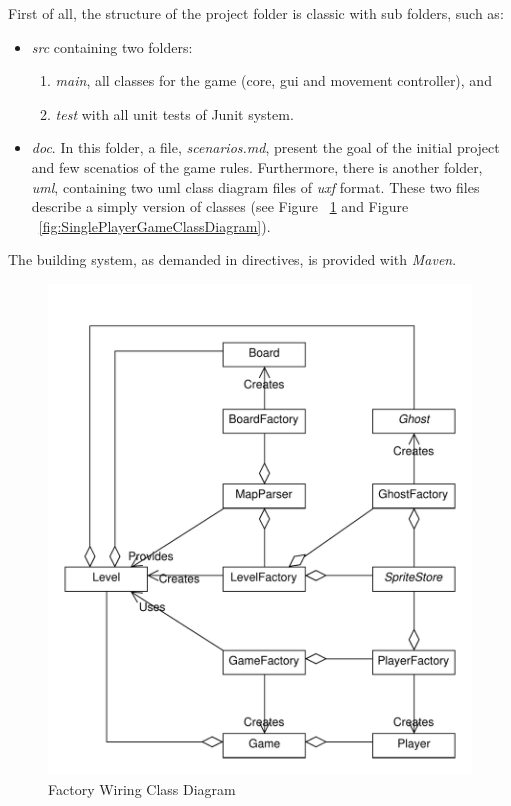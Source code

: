 \documentclass{article}
\begin{document}
First of all, the structure of the project folder is classic with sub folders, such as:
\begin{itemize}
    \item \textit{src} containing two folders:
    \begin{enumerate}
        \item \textit{main}, all classes for the game (core, gui and movement controller), and
        \item \textit{test} with all unit tests of Junit system.
    \end{enumerate}
    \item \textit{doc}. In this folder, a file, \textit{scenarios.md}, present the goal of the initial project and few scenatios of the game rules. Furthermore, there is another folder, \textit{uml}, containing two uml class diagram files of \textit{uxf} format. These two files describe a simply version of classes (see Figure ~\ref{fig:FactoryWiringClassDiagram} and Figure ~\ref{fig:SinglePlayerGameClassDiagram}).
\end{itemize}

The building system, as demanded in directives, is provided with \textit{Maven}.

\begin{figure}[h]
    \centering
    \includegraphics[scale=0.4]{imgs/FactoryWiring.pdf}
    \caption{Factory Wiring Class Diagram}
    \label{fig:FactoryWiringClassDiagram}
\end{figure}
\end{document}
